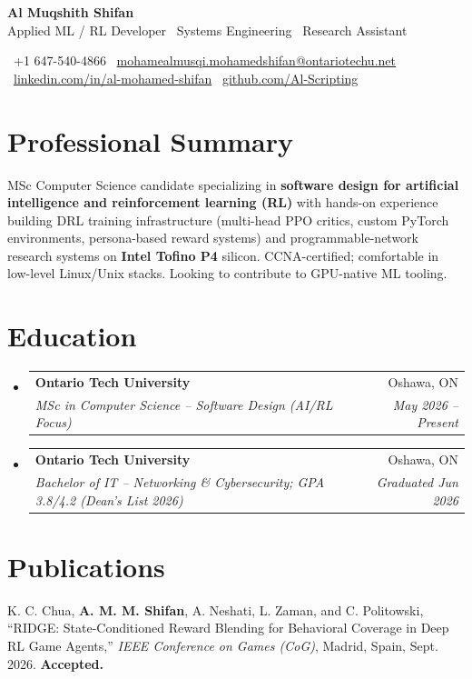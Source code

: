 \documentclass[letterpaper,10pt]{article}
\makeatletter
\newcommand{\resumeSubheading}[4]{
  \vspace{-1pt}\item
    \begin{tabular*}{0.98\textwidth}[t]{l@{\extracolsep{\fill}}r}
      \textbf{#1} & #2 \\
      \textit{\small#3} & \textit{\small #4} \\
    \end{tabular*}\vspace{-5pt}
}
\newcommand{\resumeSubHeadingListStart}{\begin{itemize}[leftmargin=0.15in, label={}]}
\newcommand{\resumeSubHeadingListEnd}{\end{itemize}}
\makeatother
\begin{document}
\begin{center}
    {\Huge \bfseries \color{primaryColor} Al Muqshith Shifan} \\ \vspace{2pt}
    \small Applied ML / RL Developer \textbullet \ Systems Engineering \textbullet \ Research Assistant \\ \vspace{2pt}

    \small
    \faMobile \ +1 647-540-4866 \quad
    \faEnvelope \ \href{mailto:mohamealmusqi.mohamedshifan@ontariotechu.net}{mohamealmusqi.mohamedshifan@ontariotechu.net} \quad
    \faLinkedin \ \href{https://www.linkedin.com/in/al-mohamed-shifan-5266b924b/}{linkedin.com/in/al-mohamed-shifan} \quad
    \faGithub \ \href{https://github.com/Al-Scripting}{github.com/Al-Scripting}
\end{center}

\vspace{-8pt}
\section{Professional Summary}
\small MSc Computer Science candidate specializing in \textbf{software design for artificial intelligence and reinforcement learning (RL)} with hands-on experience building DRL training infrastructure (multi-head PPO critics, custom PyTorch environments, persona-based reward systems) and programmable-network research systems on \textbf{Intel Tofino P4} silicon. CCNA-certified; comfortable in low-level Linux/Unix stacks. Looking to contribute to GPU-native ML tooling.

\section{Education}
  \resumeSubHeadingListStart
    \resumeSubheading
      {Ontario Tech University}{Oshawa, ON}
      {MSc in Computer Science -- Software Design (AI/RL Focus)}{May 2026 -- Present}
    \resumeSubheading
      {Ontario Tech University}{Oshawa, ON}
      {Bachelor of IT -- Networking \& Cybersecurity; GPA 3.8/4.2 (Dean's List 2026)}{Graduated Jun 2026}
  \resumeSubHeadingListEnd

\section{Publications}
 \begin{itemize}[leftmargin=0.15in, label={}]
    \small{\item{
     K. C. Chua, \textbf{A. M. M. Shifan}, A. Neshati, L. Zaman, and C. Politowski, ``RIDGE: State-Conditioned Reward Blending for Behavioral Coverage in Deep RL Game Agents,'' \emph{IEEE Conference on Games (CoG)}, Madrid, Spain, Sept. 2026. \textbf{Accepted.}
    }}
 \end{itemize}
\end{document}
